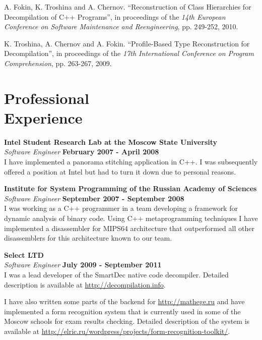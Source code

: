 \documentclass[margin,line]{CV}
\begin{document}
\begin{resume}
	A. Fokin, K. Troshina and A. Chernov. ``Reconstruction of Class Hierarchies for Decompilation of C++ Programs'',
    in proceedings of the \textsl{14th European Conference on Software Maintenance and Reengineering}, pp. 249-252, 2010.

    K. Troshina, A. Chernov and A. Fokin. ``Profile-Based Type Reconstruction for Decompilation'',
    in proceedings of the \textsl{17th International Conference on Program Comprehension}, pp. 263-267, 2009.

    \pagebreak

    \section{\mysidestyle Professional\\Experience}
    \textbf{Intel Student Research Lab at the Moscow State University} \vspace{2mm}\\\vspace{1mm}%
    \textsl{Software Engineer} \hfill \textbf{February 2007 - April 2008}\\
    I have implemented a panorama stitching application in C++. I was subsequently offered a position 
	at Intel but had to turn it down due to personal reasons.

    \textbf{Institute for System Programming of the Russian Academy of Sciences} \vspace{2mm}\\\vspace{1mm}%
    \textsl{Software Engineer} \hfill \textbf{September 2007 - September 2008}\\
    I was working as a C++ programmer in a team developing a framework for dynamic analysis of binary code.
	Using C++ metaprogramming techniques I have implemented a disassembler for MIPS64 architecture that 
	outperformed all other disassemblers for this architecture known to our team.

    \textbf{Select LTD} \vspace{2mm}\\\vspace{1mm}%
    \textsl{Software Engineer} \hfill \textbf{July 2009 - September 2011}\\
    I was a lead developer of the SmartDec native code decompiler. Detailed description is available at \url{http://decompilation.info}.
    
    I have also written some parts of the backend for \url{http://mathege.ru} and have implemented a form recognition system that is currently used in some of the Moscow schools for exam results checking. Detailed description of the system is available at \url{http://elric.ru/wordpress/projects/form-recognition-toolkit/}. 


\end{resume}
\end{document}
